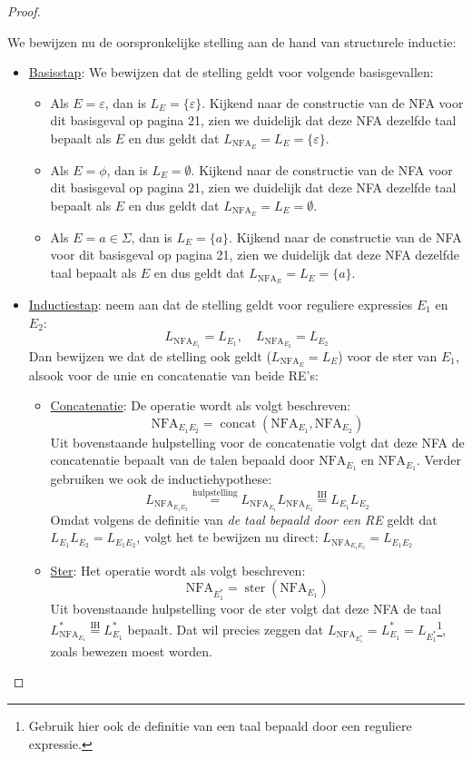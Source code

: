 \documentclass[kulak]{kulakarticle}
\newcommand{\NFA}{\text{NFA}}
\theoremstyle{definition}
\begin{document}
\begin{proof}
\begin{itemize}
		\end{itemize}

		We bewijzen nu de oorspronkelijke stelling aan de hand van structurele inductie:

		\begin{itemize}
			\item \underline{Basisstap}:
			We bewijzen dat de stelling geldt voor volgende basisgevallen:
			\begin{itemize}
				\item Als \( E=\varepsilon \), dan is \(L_E=\{\varepsilon\}\). Kijkend naar de constructie van de NFA voor dit basisgeval op pagina 21, zien we duidelijk dat deze NFA dezelfde taal bepaalt als \(E\) en dus geldt dat \(L_{\NFA_E}=L_E=\{\varepsilon\}\).
				\item Als \( E=\phi \), dan is \(L_E=\emptyset\). Kijkend naar de constructie van de NFA voor dit basisgeval op pagina 21, zien we duidelijk dat deze NFA dezelfde taal bepaalt als \(E\) en dus geldt dat \(L_{\NFA_E}=L_E=\emptyset\).
				\item Als \( E=a \in \Sigma \), dan is \(L_E=\{a\}\). Kijkend naar de constructie van de NFA voor dit basisgeval op pagina 21, zien we duidelijk dat deze NFA dezelfde taal bepaalt als \(E\) en dus geldt dat \(L_{\NFA_E}=L_E=\{a\}\).
			\end{itemize}
			\item \underline{Inductiestap}: neem aan dat de stelling geldt voor reguliere expressies \(E_1\) en \(E_2\): \[ L_{\NFA_{E_1}} = L_{E_1}, \quad L_{\NFA_{E_2}} = L_{E_2} \] Dan bewijzen we dat de stelling ook geldt (\( L_{\NFA_E}=L_E \)) voor de ster van \(E_1\), alsook voor de unie en concatenatie van beide RE's:
			\begin{itemize}
				\item \underline{Concatenatie}: De operatie wordt als volgt beschreven: \[ \NFA_{E_1E_2}=\operatorname*{concat}(\NFA_{E_1},\NFA_{E_2}) \] Uit bovenstaande hulpstelling voor de concatenatie volgt dat deze NFA de concatenatie bepaalt van de talen bepaald door \( \NFA_{E_1} \) en \( \NFA_{E_1} \). Verder gebruiken we ook de inductiehypothese: \[L_{\NFA_{E_1E_2}} \overset{\text{hulpstelling}}{=} L_{\NFA_{E_1}}L_{\NFA_{E_2}} \overset{\text{IH}}{=} L_{E_1}L_{E_2}\] Omdat volgens de definitie van \textit{de taal bepaald door een RE} geldt dat \(L_{E_1}L_{E_2}=L_{E_1E_2}\), volgt het te bewijzen nu direct: \( L_{\NFA_{E_1E_2}}=L_{E_1E_2} \)
				\item \underline{Ster}: Het operatie wordt als volgt beschreven: \[ \NFA_{E_1^*}=\operatorname*{ster}(\NFA_{E_1}) \] Uit bovenstaande hulpstelling voor de ster volgt dat deze NFA de taal \(L_{\NFA_{E_1}}^* \overset{\text{IH}}{=} L_{E_1}^*\) bepaalt. Dat wil precies zeggen dat \(L_{\NFA_{E_1^*}}=L_{E_1}^*=L_{E_1^*}\)\footnote{Gebruik hier ook de definitie van een taal bepaald door een reguliere expressie.}, zoals bewezen moest worden.

\end{itemize}
\end{itemize}
\end{proof}
\end{document}
